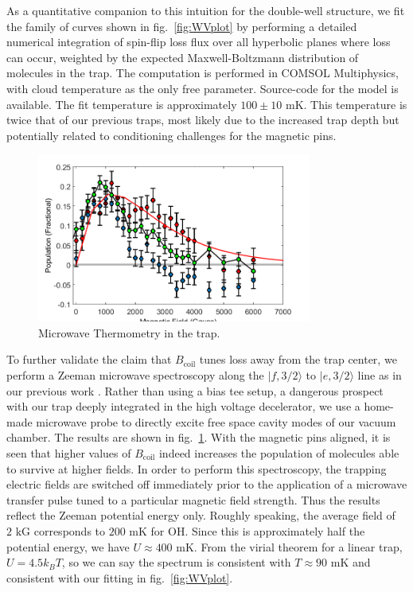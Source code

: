 \documentclass[%
 reprint,
 amsmath,amssymb,
 aps,
prl,
]{revtex4-1}
\begin{document}
As a quantitative companion to this intuition for the double-well structure, we fit the family of curves shown in fig.~\ref{fig:WVplot} by performing a detailed numerical integration of spin-flip loss flux over all hyperbolic planes where loss can occur, weighted by the expected Maxwell-Boltzmann distribution of molecules in the trap. The computation is performed in COMSOL Multiphysics, with cloud temperature as the only free parameter. Source-code for the model is available.\cite{githubCOMcode} The fit temperature is approximately $100\pm10\text{ mK}$. This temperature is twice that of our previous traps, most likely due to the increased trap depth but potentially related to conditioning challenges for the magnetic pins.

\begin{figure}
\includegraphics[width=90mm]{MW-thermometry.png}%
\caption{
Microwave Thermometry in the trap.
\label{fig:spec}}
\end{figure}

To further validate the claim that $B_\text{coil}$ tunes loss away from the trap center, we perform a Zeeman microwave spectroscopy along the $|f,3/2\rangle$ to $|e,3/2\rangle$ line as in our previous work \cite{stuhl2012evap}. Rather than using a bias tee setup, a dangerous prospect with our trap deeply integrated in the high voltage decelerator, we use a home-made microwave probe to directly excite free space cavity modes of our vacuum chamber. The results are shown in fig.~\ref{fig:spec}. With the magnetic pins aligned, it is seen that higher values of $B_{\text{coil}}$ indeed increases the population of molecules able to survive at higher fields. In order to perform this spectroscopy, the trapping electric fields are switched off immediately prior to the application of a microwave transfer pulse tuned to a particular magnetic field strength. Thus the results reflect the Zeeman potential energy only. Roughly speaking, the average field of $2\text{ kG}$ corresponds to $200\text{ mK}$ for OH. Since this is approximately half the potential energy, we have $U\approx400\text{ mK}$. From the virial theorem for a linear trap, $U = 4.5k_BT$, so we can say the spectrum is consistent with $T\approx 90\text{ mK}$ and consistent with our fitting in fig.~\ref{fig:WVplot}.
\end{document}
